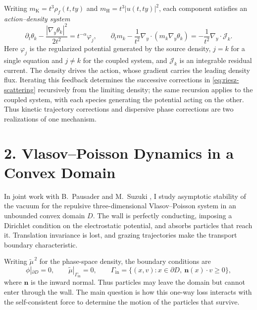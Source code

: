\documentclass[10pt,reqno]{amsart}
\newcommand{\pr}{\partial}
\begin{document}
Writing $m_{\mathrm K}=t^3\rho_f(t,ty)$ and $m_{\mathrm H}=t^3|u(t,ty)|^2$, each component satisfies an \emph{action--density system}
\[
\pr_t\theta_k-\frac{|\nabla_y\theta_k|^2}{2t^2}=t^{-\alpha}\varphi_j,\qquad
\pr_t m_k-\frac1{t^2}\nabla_y\cdot(m_k\nabla_y\theta_k)
=-\frac1{t^2}\nabla_y\cdot\mathcal J_k.
\]
Here $\varphi_j$ is the regularized potential generated by the source density, $j=k$ for a single equation and $j\neq k$ for the coupled system, and $\mathcal J_k$ is an integrable residual current. The density drives the action, whose gradient carries the leading density flux. Iterating this feedback determines the successive corrections in \eqref{eq:riesz-scattering} recursively from the limiting density; the same recursion applies to the coupled system, with each species generating the potential acting on the other. Thus kinetic trajectory corrections and dispersive phase corrections are two realizations of one mechanism.

\section*{2. Vlasov--Poisson Dynamics in a Convex Domain}

In joint work with B.~Pausader and M.~Suzuki \cite{HPS24}, I study asymptotic stability of the vacuum for the repulsive three-dimensional Vlasov--Poisson system in an unbounded convex domain $D$. The wall is perfectly conducting, imposing a Dirichlet condition on the electrostatic potential, and absorbs particles that reach it. Translation invariance is lost, and grazing trajectories make the transport boundary characteristic.

Writing $\widetilde\mu^{\,2}$ for the phase-space density, the boundary conditions are
\[
\phi|_{\partial D}=0,\qquad
\widetilde\mu|_{\Gamma_{\mathrm{in}}}=0,\qquad
\Gamma_{\mathrm{in}}=\{(x,v):x\in\partial D,\ \mathbf n(x)\cdot v\geq0\},
\]
where $\mathbf n$ is the inward normal. Thus particles may leave the domain but cannot enter through the wall. The main question is how this one-way loss interacts with the self-consistent force to determine the motion of the particles that survive.
\end{document}
